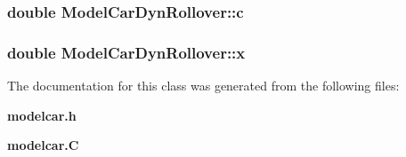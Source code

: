 \subsubsection{\setlength{\rightskip}{0pt plus 5cm}double Model\-Car\-Dyn\-Rollover::c}\label{classModelCarDynRollover_m1}


\subsubsection{\setlength{\rightskip}{0pt plus 5cm}double Model\-Car\-Dyn\-Rollover::x}\label{classModelCarDynRollover_m9}




The documentation for this class was generated from the following files:\begin{CompactItemize}
\item 
{\bf modelcar.h}\item 
{\bf modelcar.C}\end{CompactItemize}
